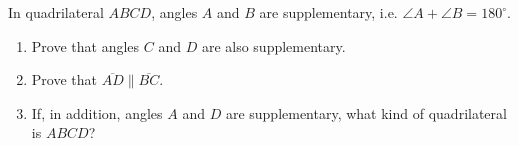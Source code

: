 In quadrilateral $ABCD$, angles $A$ and $B$ are supplementary, i.e. $\angle A+\angle B=180^\circ$.
\begin{enumerate}
\item[(a)] Prove that angles $C$ and $D$ are also supplementary.
\item[(b)] Prove that $\overline{AD}\parallel\overline{BC}$.
\item[(c)] If, in addition, angles $A$ and $D$ are supplementary, what kind of quadrilateral is $ABCD$?
\end{enumerate}
